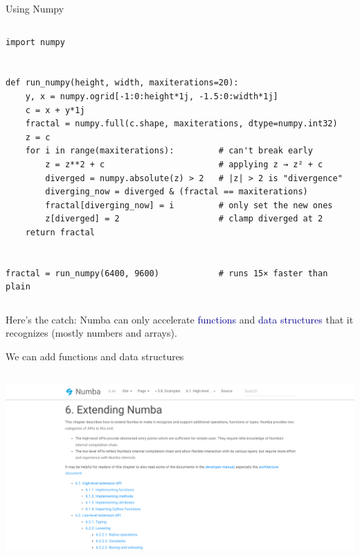 \documentclass[aspectratio=169]{beamer}
\begin{document}
\begin{frame}[fragile]{Using Numpy}
\begin{columns}
\small
\begin{verbatim}
import numpy


def run_numpy(height, width, maxiterations=20):
    y, x = numpy.ogrid[-1:0:height*1j, -1.5:0:width*1j]
    c = x + y*1j
    fractal = numpy.full(c.shape, maxiterations, dtype=numpy.int32)
    z = c
    for i in range(maxiterations):         # can't break early
        z = z**2 + c                       # applying z → z² + c
        diverged = numpy.absolute(z) > 2   # |z| > 2 is "divergence"
        diverging_now = diverged & (fractal == maxiterations)
        fractal[diverging_now] = i         # only set the new ones
        z[diverged] = 2                    # clamp diverged at 2
    return fractal


fractal = run_numpy(6400, 9600)            # runs 15× faster than plain
\end{verbatim}
\end{columns}
\end{frame}

\begin{frame}{Here's the catch:}
\Large
\vspace{0.5 cm}
Numba can only accelerate \textcolor{darkblue}{functions} and \textcolor{darkblue}{data structures} that it recognizes (mostly numbers and arrays).

\vspace{1 cm}

\vspace{1 cm}
\end{frame}

\begin{frame}{We can add functions and data structures}
\vspace{0.5 cm}
\begin{columns}
\includegraphics[width=\linewidth]{numba-extending.png}
\end{columns}
\end{frame}
\end{document}
